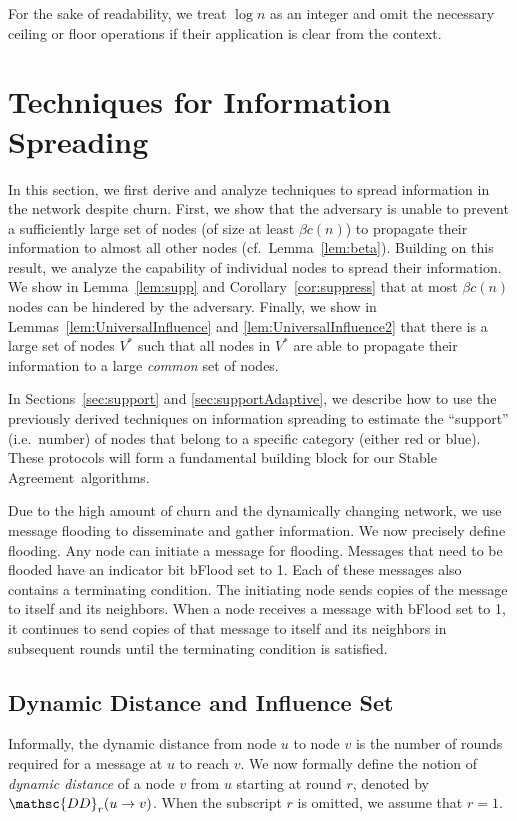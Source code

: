 \documentclass[leqno,11pt]{article}
\newcommand{\dd}{{\mathsc{DD}}}
\newcommand{\sa}{{\sc Stable Agreement}}
\begin{document}
For the sake of readability, we treat $\log n$ as an integer and omit the
necessary ceiling or floor operations if their application is clear from the
context.










\section{Techniques for Information Spreading} \label{sec:techniques}
In this section, we first derive and analyze techniques to spread information in the network despite churn.
First, we show that the adversary is unable to prevent a sufficiently large set of nodes (of size at least $\beta c(n)$) to propagate their information to almost all other nodes (cf.\ Lemma~\ref{lem:beta}). 
Building on this result, we analyze the capability of individual nodes to spread their information.
We show in Lemma~\ref{lem:supp} and Corollary~\ref{cor:suppress} that at most $\beta c(n)$ nodes can be hindered by the adversary.
Finally, we show in Lemmas~\ref{lem:UniversalInfluence} and \ref{lem:UniversalInfluence2} that there is a large set of nodes $V^*$ such that all nodes in $V^*$ are able to propagate their information to a large \emph{common} set of nodes.

In Sections~\ref{sec:support} and \ref{sec:supportAdaptive}, we describe how to use the previously derived techniques on information spreading to estimate the ``support'' (i.e.\ number) of nodes that belong to a specific category (either red or blue).
These protocols will form a fundamental building block for our \sa\ algorithms.

Due to the high amount of churn and the dynamically changing network, we use message flooding to disseminate and gather information. We now
precisely define flooding. Any node can initiate a  message for flooding.
Messages that need to be flooded have an indicator bit {\sc bFlood} set to 1.
Each of these messages also contains a terminating condition.  The initiating
node sends copies of the message to itself and its neighbors. When a node receives a
message with {\sc bFlood} set to 1, it continues  to send copies of that message to itself
and its neighbors in subsequent rounds until the terminating condition is
satisfied. 


\subsection{Dynamic Distance and Influence Set} \label{sec:dynamic}
Informally, the dynamic distance from node $u$ to node $v$ 
is the number of rounds required for a message at $u$ to reach $v$.
We now formally define the notion of {\em dynamic distance} of a node $v$ from $u$ starting at
round $r$, denoted by $\dd_r(u \to v)$. When the subscript $r$ is omitted, we
 assume that $r=1$. 
\end{document}
